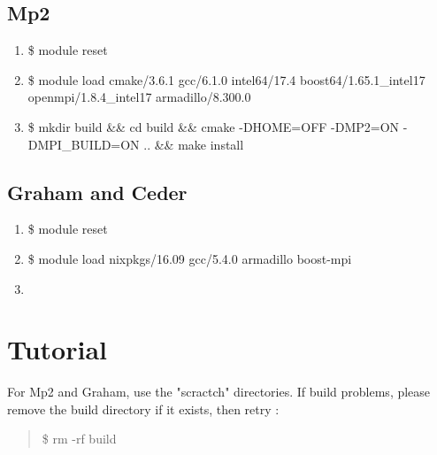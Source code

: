 \documentclass[letterpaper,10pt,english]{sphinxmanual}
\begin{document}
\section{Mp2}
\label{\detokenize{installation:mp2}}\begin{enumerate}
\item {} 
\$ module reset

\item {} 
\$ module load cmake/3.6.1  gcc/6.1.0  intel64/17.4  boost64/1.65.1\_intel17 openmpi/1.8.4\_intel17  armadillo/8.300.0

\item {} 
\$ mkdir build \&\& cd build \&\& cmake -DHOME=OFF -DMP2=ON -DMPI\_BUILD=ON .. \&\& make install

\end{enumerate}


\section{Graham and Ceder}
\label{\detokenize{installation:graham-and-ceder}}\begin{enumerate}
\item {} 
\$ module reset

\item {} 
\$ module load nixpkgs/16.09  gcc/5.4.0 armadillo boost-mpi

\item {} 

\end{enumerate}
\label{\detokenize{tutorial:tutorial}}

\chapter{Tutorial}
\label{\detokenize{tutorial::doc}}\label{\detokenize{tutorial:id1}}
For Mp2 and Graham, use the "scractch" directories. If build problems,
please remove the build directory if it exists, then retry :
\begin{quote}

\$ rm -rf build
\end{quote}
\end{document}
